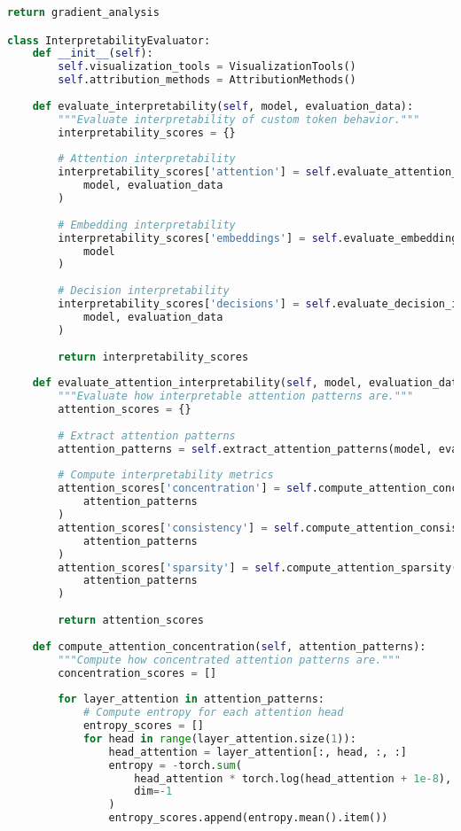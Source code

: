 \begin{lstlisting}[language=Python, caption=Comprehensive evaluation framework for custom tokens]
        return gradient_analysis

class InterpretabilityEvaluator:
    def __init__(self):
        self.visualization_tools = VisualizationTools()
        self.attribution_methods = AttributionMethods()
    
    def evaluate_interpretability(self, model, evaluation_data):
        """Evaluate interpretability of custom token behavior."""
        interpretability_scores = {}
        
        # Attention interpretability
        interpretability_scores['attention'] = self.evaluate_attention_interpretability(
            model, evaluation_data
        )
        
        # Embedding interpretability
        interpretability_scores['embeddings'] = self.evaluate_embedding_interpretability(
            model
        )
        
        # Decision interpretability
        interpretability_scores['decisions'] = self.evaluate_decision_interpretability(
            model, evaluation_data
        )
        
        return interpretability_scores
    
    def evaluate_attention_interpretability(self, model, evaluation_data):
        """Evaluate how interpretable attention patterns are."""
        attention_scores = {}
        
        # Extract attention patterns
        attention_patterns = self.extract_attention_patterns(model, evaluation_data)
        
        # Compute interpretability metrics
        attention_scores['concentration'] = self.compute_attention_concentration(
            attention_patterns
        )
        attention_scores['consistency'] = self.compute_attention_consistency(
            attention_patterns
        )
        attention_scores['sparsity'] = self.compute_attention_sparsity(
            attention_patterns
        )
        
        return attention_scores
    
    def compute_attention_concentration(self, attention_patterns):
        """Compute how concentrated attention patterns are."""
        concentration_scores = []
        
        for layer_attention in attention_patterns:
            # Compute entropy for each attention head
            entropy_scores = []
            for head in range(layer_attention.size(1)):
                head_attention = layer_attention[:, head, :, :]
                entropy = -torch.sum(
                    head_attention * torch.log(head_attention + 1e-8),
                    dim=-1
                )
                entropy_scores.append(entropy.mean().item())
            

\end{lstlisting}
